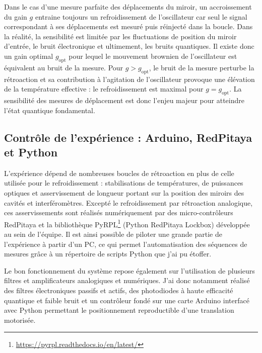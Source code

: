 \documentclass[12pt,a4paper]{article}
\begin{document}
Dans le cas d'une mesure parfaite des déplacements du miroir, un accroissement du gain $g$ entraine toujours un refroidissement de l'oscillateur car seul le signal correspondant à ses déplacements est mesuré puis réinjecté dans la boucle.
Dans la réalité, la sensibilité est limitée par les fluctuations de position du miroir d'entrée, le bruit électronique et ultimement, les bruits quantiques.
Il existe donc un gain optimal $g_\mathrm{opt}$ pour lequel le mouvement brownien de l'oscillateur est équivalent au bruit de la mesure.
Pour $g>g_\mathrm{opt}$, le bruit de la mesure perturbe la rétroaction et sa contribution à l'agitation de l'oscillateur provoque une élévation de la température effective : le refroidissement est maximal pour $g=g_\mathrm{opt}$.
La sensibilité des mesures de déplacement est donc l'enjeu majeur pour atteindre l'état quantique fondamental.

\subsection{Contrôle de l'expérience : Arduino, RedPitaya et Python}
\label{sec:controls}

L'expérience dépend de nombreuses boucles de rétroaction en plus de celle utilisée pour le refroidissement : stabilisations de températures, de puissances optiques et asservissement de longueur portant sur la position des miroirs des cavités et interféromètres.
Excepté le refroidissement par rétroaction analogique, ces asservissements sont réalisés numériquement par des micro-contrôleurs RedPitaya et la bibliothèque PyRPL\footnote{\url{https://pyrpl.readthedocs.io/en/latest/}} (Python RedPitaya Lockbox) développée au sein de l'équipe.
Il est ainsi possible de piloter une grande partie de l'expérience à partir d'un PC, ce qui permet l'automatisation des séquences de mesures grâce à un répertoire de scripts Python que j'ai pu étoffer.

Le bon fonctionnement du système repose également sur l'utilisation de plusieurs filtres et amplificateurs analogiques et numériques.
J'ai donc notamment réalisé des filtres électroniques passifs et actifs, des photodiodes à haute efficacité quantique et faible bruit et un contrôleur fondé sur une carte Arduino interfacé avec Python permettant le positionnement reproductible d'une translation motorisée.
\end{document}
